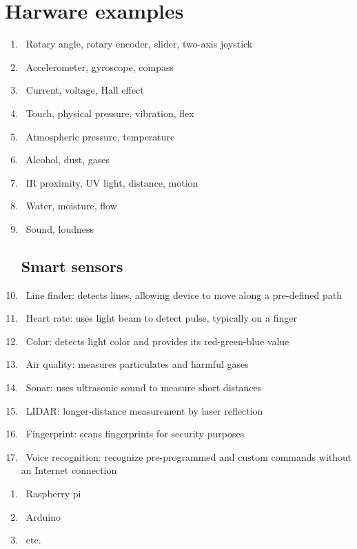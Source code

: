 \documentclass[12pt]{article}
\begin{document}
 \section {Harware examples}

\begin{enumerate}
\subsection {Sensors}
\item\ Rotary angle, rotary encoder, slider, two-axis joystick
\item\ Accelerometer, gyroscope, compass
\item\ Current, voltage, Hall effect
\item\ Touch, physical pressure, vibration, flex
\item\ Atmospheric pressure, temperature
\item\ Alcohol, dust, gases
\item\ IR proximity, UV light, distance, motion
\item\ Water, moisture, flow
\item\ Sound, loudness

\subsection {Smart sensors}
\item\ Line finder: detects lines, allowing device to move along a pre-defined path
\item\ Heart rate: uses light beam to detect pulse, typically on a finger
\item\ Color: detects light color and provides its red-green-blue value
\item\ Air quality: measures particulates and harmful gases
\item\ Sonar: uses ultrasonic sound to measure short distances
\item\ LIDAR: longer-distance measurement by laser reflection
\item\ Fingerprint: scans fingerprints for security purposes
\item\ Voice recognition: recognize pre-programmed and custom commands without an Internet connection

\end{enumerate}

\begin{enumerate}
\item\ Raspberry pi
\item\ Arduino
\item\ etc.
\end{enumerate}
\end{document}
